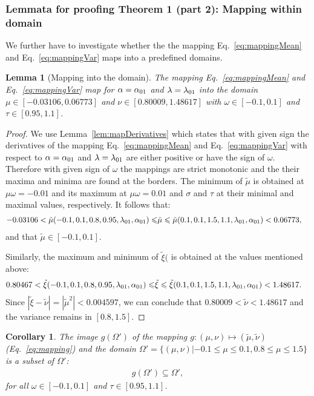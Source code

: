 \documentclass{article}
\newtheorem{corollary}[theorem]{Corollary}\newtheorem{proposition}[theorem]{Proposition}\newtheorem{lemma}[theorem]{Lemma}\newtheorem{conjecture}[theorem]{Conjecture}\newtheorem*{theorem*}{Theorem}
\newcommand\munn{{\tilde \mu}}
\newcommand\nunn{{\tilde \nu}}
\newcommand\xinn{{\tilde \xi}}
\renewcommand{\leq}{\leqslant}
\begin{document}
\subsubsection{Lemmata for proofing Theorem 1 (part 2): Mapping within domain}
\label{sec:maptoregion}

We further have to investigate whether the the mapping  Eq.~\eqref{eq:mappingMean}
and Eq.~\eqref{eq:mappingVar} maps into a predefined domains.

\begin{lemma}[Mapping into the domain]
\label{lem:region}
The mapping   Eq.~\eqref{eq:mappingMean}
and Eq.~\eqref{eq:mappingVar} map for 
 $\alpha = \alpha_{\rm 01}$ and $\lambda=\lambda_{\rm 01}$
into the domain
$\mu \in [-0.03106, 0.06773]$ and
$\nu \in [0.80009,1.48617]$ with $\omega \in [-0.1,0.1]$ and $\tau \in [0.95,1.1]$.
\end{lemma}


\begin{proof}
We use Lemma~\ref{lem:mapDerivatives} which states that with given
sign the derivatives of the mapping Eq.~\eqref{eq:mappingMean}
and Eq.~\eqref{eq:mappingVar} with respect to  $\alpha = \alpha_{\rm 01}$
and $\lambda=\lambda_{\rm 01}$ are either positive or have the sign of
$\omega$.
Therefore with given sign of $\omega$ the mappings are strict monotonic and
the their maxima and minima are found at the borders.  The minimum of $\munn$ is obtained at
$\mu \omega = -0.01$ and its maximum at $\mu \omega=0.01$ and $\sigma$ and $\tau$ at their 
minimal and maximal values, respectively. It follows that:
\begin{align}
-0.03106 <\munn(-0.1,0.1, 0.8, 0.95, \lambda_{\rm 01}, \alpha_{\rm 01})  \leq  & \munn \leq \munn(0.1,0.1,1.5, 1.1, \lambda_{\rm 01}, \alpha_{\rm 01}) < 0.06773,
\end{align}
and that $\munn \in [-0.1,0.1]$.

Similarly, the maximum and minimum of $\xinn($ is obtained at the values mentioned above:
\begin{align}
0.80467 <\xinn(-0.1,0.1, 0.8, 0.95, \lambda_{\rm 01}, \alpha_{\rm 01})  \leq  & \xinn \leq \xinn(0.1,0.1,1.5, 1.1, \lambda_{\rm 01}, \alpha_{\rm 01}) < 1.48617. 
\end{align}
Since $|\xinn-\nunn| = |\munn^2| < 0.004597$, we can conclude that 
$0.80009 < \nunn < 1.48617$ and the variance remains in $[0.8,1.5]$.
\end{proof}


\begin{corollary}
 The image $g(\Omega')$ of the mapping $g:(\mu,\nu) \mapsto (\munn, \nunn)$ (Eq.~\eqref{eq:mapping})
 and the domain $\Omega'=\{(\mu,\nu) | -0.1 \leq \mu \leq 0.1, 0.8 \leq \mu \leq 1.5 \}$ is 
 a subset of $\Omega'$: 
 \begin{align} g(\Omega') \subseteq \Omega', \end{align}
 for all $\omega \in [-0.1,0.1]$ and $\tau \in [0.95,1.1]$.
\end{corollary}
\end{document}
